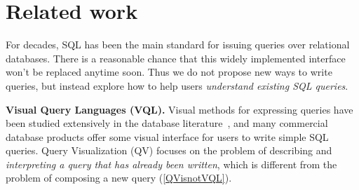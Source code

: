 \documentclass[letterpaper,11pt]{article}
\newcommand{\introparagraph}[1]{\textbf{#1.}}        %
\begin{document}














\section{Related work}
\label{sec:relatedWork}





For decades, SQL has been the main standard for issuing queries over relational databases.
There is a reasonable chance that this widely implemented interface won't be replaced anytime soon. 
Thus we do not propose new ways to write queries, 
but instead explore how to help users \emph{understand existing SQL queries}. 


\introparagraph{Visual Query Languages (VQL)}
Visual methods for expressing queries have been studied
extensively in the database literature~\cite{DBLP:journals/vlc/CatarciCLB97}, 
%
%
and
many commercial database products offer some visual interface for users to write simple SQL queries.
Query Visualization (QV) focuses on the problem of describing and \emph{interpreting a query that has already been written}, which is 
different from the problem of composing a new query (\autoref{QVisnotVQL}).



















%
%
%
\end{document}
